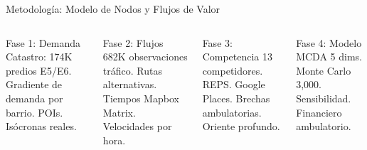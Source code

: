 \documentclass[aspectratio=169, 11pt]{beamer}
\begin{document}
\begin{frame}{Metodología: Modelo de Nodos y Flujos de Valor}
\begin{center}
\end{center}

\vspace{6pt}
\begin{columns}[T]
\begin{block}{\tiny Fase 1: Demanda}
\tiny
Catastro: 174K predios E5/E6. Gradiente de demanda por barrio. POIs. Isócronas reales.
\end{block}

\begin{block}{\tiny Fase 2: Flujos}
\tiny
682K observaciones tráfico. Rutas alternativas. Tiempos Mapbox Matrix. Velocidades por hora.
\end{block}

\begin{block}{\tiny Fase 3: Competencia}
\tiny
13 competidores. REPS. Google Places. Brechas ambulatorias. Oriente profundo.
\end{block}

\begin{block}{\tiny Fase 4: Modelo}
\tiny
MCDA 5 dims. Monte Carlo 3,000. Sensibilidad. Financiero ambulatorio.
\end{block}
\end{columns}
\end{frame}
\end{document}
